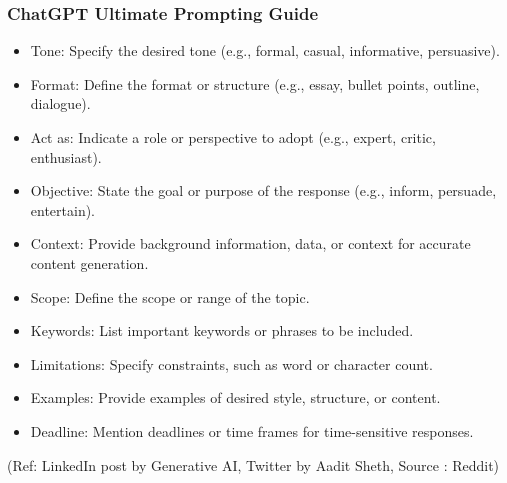 \begin{frame}[fragile]\frametitle{ChatGPT Ultimate Prompting Guide}

\begin{itemize}
\item Tone: Specify the desired tone (e.g., formal, casual, informative, persuasive).
\item Format: Define the format or structure (e.g., essay, bullet points, outline, dialogue). 
\item Act as: Indicate a role or perspective to adopt (e.g., expert, critic, enthusiast). 
\item Objective: State the goal or purpose of the response (e.g., inform, persuade, entertain). 
\item Context: Provide background information, data, or context for accurate content generation. 
\item Scope: Define the scope or range of the topic.
\item Keywords: List important keywords or phrases to be included.
\item Limitations: Specify constraints, such as word or character count.
\item Examples: Provide examples of desired style, structure, or content.
\item Deadline: Mention deadlines or time frames for time-sensitive responses. 
\end{itemize}	 


{\tiny (Ref: LinkedIn post by Generative AI, Twitter by Aadit Sheth, Source : Reddit)}
			

\end{frame}


